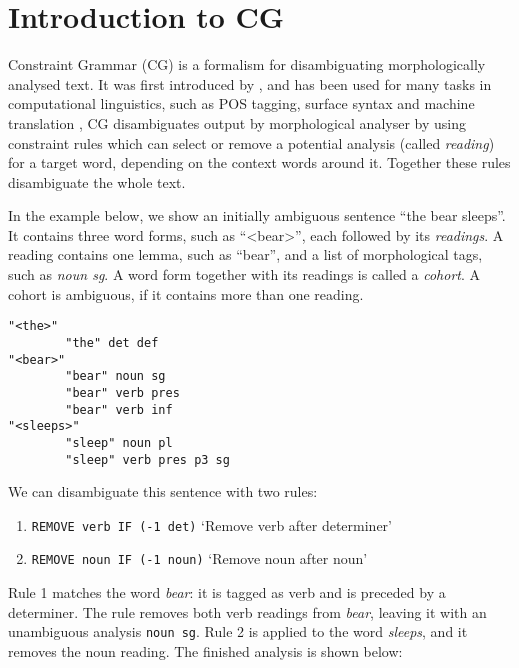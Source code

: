 \section{Introduction to CG}
 

Constraint Grammar (CG) is a formalism for 
disambiguating morphologically analysed text. 
It was first introduced by
\cite{karlsson1995constraint}, and has been used for many tasks in
computational linguistics, such as POS tagging, surface syntax and
machine translation \cite{bick2011},
CG disambiguates output by morphological analyser by using
constraint rules which can select or remove a potential analysis (called \emph{reading})
for a target word, depending on the context words around it. 
Together these rules disambiguate the whole text.

In the example below, we show an initially ambiguous sentence ``the bear
sleeps''. 
It contains three word forms, such as ``<bear>'', each followed by its \emph{readings}.
A reading contains one lemma, such as ``bear'', and a list of morphological tags, such as \emph{noun sg}.
A word form together with its readings is called a \emph{cohort}. A cohort is ambiguous, if it contains more than one reading.


\begin{center}
\begin{verbatim}
"<the>"
        "the" det def
"<bear>"
        "bear" noun sg
        "bear" verb pres
        "bear" verb inf
"<sleeps>"
        "sleep" noun pl
        "sleep" verb pres p3 sg
\end{verbatim}
\end{center}


\noindent We can disambiguate this sentence with two rules:

\begin{enumerate}
\def\labelenumi{\arabic{enumi}.}
\itemsep1pt\parskip0pt
\item \texttt{REMOVE verb IF (-1 det)}
  `Remove verb after determiner'
\item  \texttt{REMOVE noun IF (-1 noun)}
  `Remove noun after noun'
\end{enumerate}

\noindent Rule 1 matches the word \emph{bear}: it is tagged as verb and is
preceded by a determiner. The rule removes both verb readings from
\emph{bear}, leaving it with an unambiguous analysis \texttt{noun sg}.
Rule 2 is applied to the word \emph{sleeps}, and it removes the noun
reading. The finished analysis is shown below:


